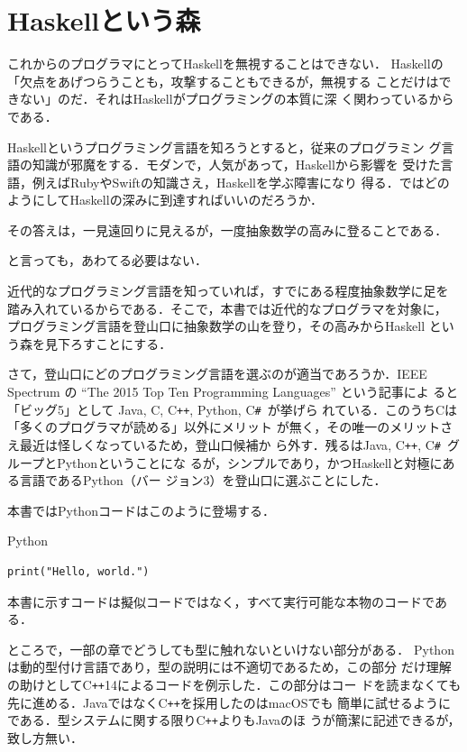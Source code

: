 \documentclass[a5paper,twoside,fleqn]{jsbook}
\newcommand{\programminglanguage}[1]{\textsf{#1}}
\newcommand{\clang}{\programminglanguage{C}}
\newcommand{\csharp}{\programminglanguage{C}\texttt{\#}}
\newcommand{\cxx}{\programminglanguage{C}\texttt{++}}
\newcommand{\cxxfourteen}{\cxx\programminglanguage{14}}
\newcommand{\haskell}{\programminglanguage{Haskell}}
\newcommand{\java}{\programminglanguage{Java}}
\newcommand{\python}{\programminglanguage{Python}}
\newcommand{\ruby}{\programminglanguage{Ruby}}
\newcommand{\swift}{\programminglanguage{Swift}}
\newenvironment{pythoncode}{\begin{itembox}[r]{\python}}{\end{itembox}}
\begin{document}
\section{\haskell という森}

これからのプログラマにとって\haskell を無視することはできない．
\haskell の「欠点をあげつらうことも，攻撃することもできるが，無視する
  ことだけはできない」のだ．それは\haskell がプログラミングの本質に深
く関わっているからである．

\haskell というプログラミング言語を知ろうとすると，従来のプログラミン
グ言語の知識が邪魔をする．モダンで，人気があって，\haskell から影響を
受けた言語，例えば\ruby や\swift の知識さえ，\haskell を学ぶ障害になり
得る．ではどのようにして\haskell の深みに到達すればいいのだろうか．

その答えは，一見遠回りに見えるが，一度抽象数学の高みに登ることである．

と言っても，あわてる必要はない．

近代的なプログラミング言語を知っていれば，すでにある程度抽象数学に足を
踏み入れているからである．そこで，本書では近代的なプログラマを対象に，
プログラミング言語を登山口に抽象数学の山を登り，その高みから\haskell
という森を見下ろすことにする．


さて，登山口にどのプログラミング言語を選ぶのが適当であろうか．IEEE
Spectrum の ``The 2015 Top Ten Programming Languages'' という記事によ
ると「ビッグ5」として \java, \clang, \cxx, \python, \csharp\ が挙げら
れている．このうち\clang は「多くのプログラマが読める」以外にメリット
が無く，その唯一のメリットさえ最近は怪しくなっているため，登山口候補か
ら外す．残るは\java, \cxx, \csharp\ グループと\python ということにな
るが，シンプルであり，かつ\haskell と対極にある言語である\python（バー
  ジョン3）を登山口に選ぶことにした．

本書では\python コードはこのように登場する．
\begin{pythoncode}
\begin{verbatim}
print("Hello, world.")
\end{verbatim}
\end{pythoncode}
本書に示すコードは擬似コードではなく，すべて実行可能な本物のコードであ
る．

ところで，一部の章でどうしても型に触れないといけない部分がある．
\python は動的型付け言語であり，型の説明には不適切であるため，この部分
だけ理解の助けとして\cxxfourteen によるコードを例示した．この部分はコー
ドを読まなくても先に進める．\java ではなく\cxx を採用したのはmacOSでも
簡単に試せるようにである．型システムに関する限り\cxx よりも\java のほ
うが簡潔に記述できるが，致し方無い．
\end{document}
